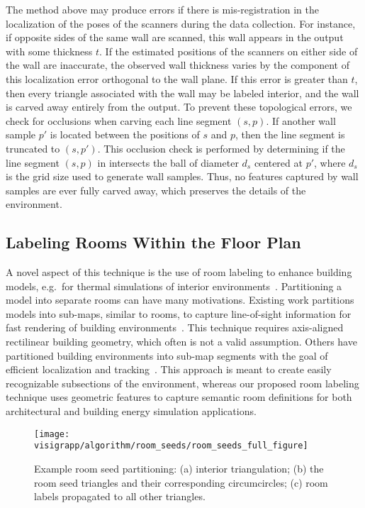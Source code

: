 \documentclass[12pt,onecolumn,oneside]{book}
\begin{document}
The method above may produce errors if there is mis-registration in the localization of the poses of the scanners during the data collection.  For instance, if opposite sides of the same wall are scanned, this wall appears in the output with some thickness $t$.  If the estimated positions of the scanners on either side of the wall are inaccurate, the observed wall thickness varies by the component of this localization error orthogonal to the wall plane.  If this error is greater than $t$, then every triangle associated with the wall may be labeled interior, and the wall is carved away entirely from the output.  To prevent these topological errors, we check for occlusions when carving each line segment $(s,p)$.  If another wall sample $p'$ is located between the positions of $s$ and $p$, then the line segment is truncated to $(s,p')$.  This occlusion check is performed by determining if the line segment $(s,p)$ in intersects the ball of diameter $d_s$ centered at $p'$, where $d_s$ is the grid size used to generate wall samples.  Thus, no features captured by wall samples are ever fully carved away, which preserves the details of the environment.

\subsection{Labeling Rooms Within the Floor Plan}
\label{ssec:room_label}

A novel aspect of this technique is the use of room labeling to enhance building models, e.g.\ for thermal simulations of interior environments~\cite{Turner14,EnergyPlus}.  Partitioning a model into separate rooms can have many motivations.  Existing work partitions models into sub-maps, similar to rooms, to capture line-of-sight information for fast rendering of building environments~\cite{WalkthroughRendering}.  This technique requires axis-aligned rectilinear building geometry, which often is not a valid assumption.  Others have partitioned building environments into sub-map segments with the goal of efficient localization and tracking~\cite{SpectralClustering}.  This approach is meant to create easily recognizable subsections of the environment, whereas our proposed room labeling technique uses geometric features to capture semantic room definitions for both architectural and building energy simulation applications.

\begin{figure}[p]
  \centering
  \texttt{[image: visigrapp/algorithm/room\_seeds/room\_seeds\_full\_figure]}
  \caption[Example room seed partitioning.]{Example room seed partitioning: (a) interior triangulation; (b) the room seed triangles and their corresponding circumcircles; (c) room labels propagated to all other triangles.}
  \label{fig:roomlabeling}
\end{figure}
\end{document}
